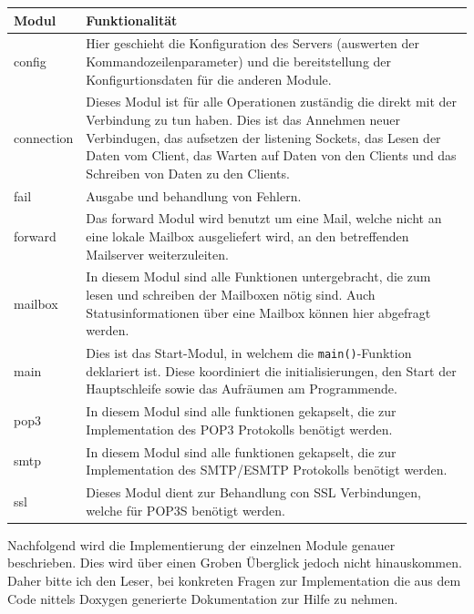 \documentclass[final,a4paper,11pt,notitlepage,halfparskip]{scrreprt}
\begin{document}
\begin{tabular}[h]{lp{30em}}
  Modul       & Funktionalität \\
  \hline\hline
  config      & Hier geschieht die Konfiguration des Servers (auswerten der
                Kommandozeilenparameter) und die bereitstellung der 
		Konfigurtionsdaten für die anderen Module.\\
  connection  & Dieses Modul ist für alle Operationen zuständig die direkt mit
                der Verbindung zu tun haben. Dies ist das Annehmen neuer
		Verbindugen, das aufsetzen der listening Sockets, das Lesen der
		Daten vom Client, das Warten auf Daten von den Clients und das
		Schreiben von Daten zu den Clients.\\
  fail        & Ausgabe und behandlung von Fehlern.\\
  forward     & Das forward Modul wird benutzt um eine Mail, welche nicht an
                eine lokale Mailbox ausgeliefert wird, an den betreffenden
		Mailserver weiterzuleiten.\\
  mailbox     & In diesem Modul sind alle Funktionen untergebracht, die zum
                lesen und schreiben der Mailboxen nötig sind. Auch
		Statusinformationen über eine Mailbox können hier abgefragt
		werden.\\
  main        & Dies ist das Start-Modul, in welchem die 
                \texttt{main()}-Funktion deklariert ist. Diese koordiniert die
		initialisierungen, den Start der Hauptschleife sowie das
		Aufräumen am Programmende.\\
  pop3        & In diesem Modul sind alle funktionen gekapselt, die zur
                Implementation des POP3 Protokolls benötigt werden.\\
  smtp        & In diesem Modul sind alle funktionen gekapselt, die zur
                Implementation des SMTP/ESMTP Protokolls benötigt werden.\\
  ssl         & Dieses Modul dient zur Behandlung con SSL Verbindungen, welche
                für POP3S benötigt werden.\\
  \hline
\end{tabular}
\vspace{3mm}

Nachfolgend wird die Implementierung der einzelnen Module genauer beschrieben.
Dies wird über einen Groben Überglick jedoch nicht hinauskommen. Daher bitte ich
den Leser, bei konkreten Fragen zur Implementation die aus dem Code nittels
Doxygen generierte Dokumentation zur Hilfe zu nehmen. 
\end{document}

